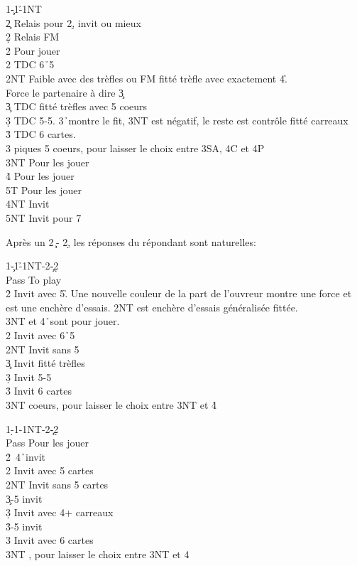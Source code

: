 \documentclass[a4paper]{article}
\begin{document}
\begin{bidtable}
1\c-1\h-1NT\+\\
2\c \> Relais pour 2\d , invit ou mieux\\
2\d \> Relais FM\\
2\h \> Pour jouer\\
2\s \> TDC 6\h\ 5\s \\
2NT \> Faible avec des trèfles ou FM fitté trèfle avec exactement 4\h .\+\\
Force \> le partenaire à dire 3\c \-\\
3\c \> TDC fitté trèfles avec 5 coeurs\\
3\d \> TDC 5-5. 3\h\ montre le fit, 3NT est négatif, le reste est contrôle fitté carreaux\\
3\h \> TDC 6 cartes.\\
3\s {} piques 5 coeurs, pour laisser le choix entre 3SA, 4C et 4P\\
3NT \> Pour les jouer\\
4\h \> Pour les jouer\\
5T \> Pour les jouer\\
4NT \> Invit\\
5NT \> Invit pour 7\-
\end{bidtable}

Après un 2\c\ - 2\d , les réponses du répondant sont naturelles:

\begin{bidtable}
1\c-1\h-1NT-2\c-2\d\+\\
Pass \> To play\\
2\h \> Invit avec 5\h . Une nouvelle couleur de la part de l'ouvreur montre une force et\\
\>est une enchère d'essais. 2NT est enchère d'essais généralisée fittée.\\
\>3NT et 4\h\ sont pour jouer.\\
2\s \> Invit avec 6\h\ 5\s \\
2NT \> Invit sans 5\h \\
3\c \> Invit fitté trèfles\\
3\d \> Invit 5-5\\
3\h \> Invit 6 cartes\\
3NT  coeurs, pour laisser le choix entre 3NT et 4\h \-
\end{bidtable}

\begin{bidtable}
1\d-1\s-1NT-2\c-2\d\+\\
Pass \> Pour les jouer\\
2\h {}\s\ 4\h\ invit\\
2\s \> Invit avec 5 cartes\\
2NT \> Invit sans 5 cartes\\
3\c {}-5 invit\\
3\d \> Invit avec 4+ carreaux\\
3\h {}-5 invit\\
3\s \> Invit avec 6 cartes\\
3NT \s , pour laisser le choix entre 3NT et 4\s \-
\end{bidtable}
\end{document}
